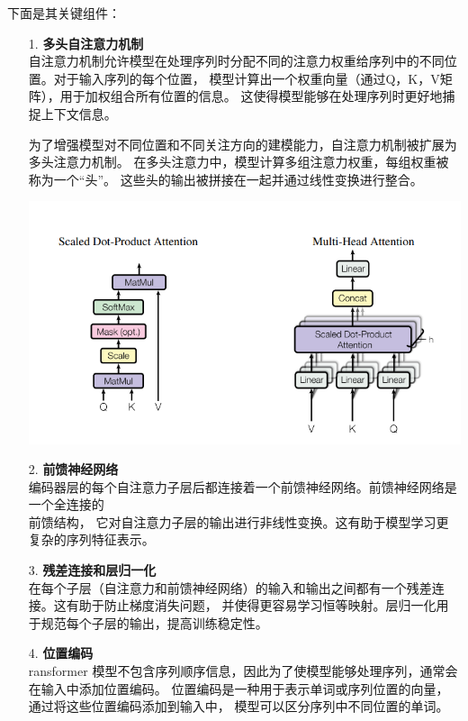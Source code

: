 \documentclass[11pt]{article}
\begin{document}
            下面是其关键组件：
            \begin{enumerate}
                \item [1. ]\textbf{多头自注意力机制}\\
                自注意力机制允许模型在处理序列时分配不同的注意力权重给序列中的不同位置。对于输入序列的每个位置，
                模型计算出一个权重向量（通过Q，K，V矩阵），用于加权组合所有位置的信息。
                这使得模型能够在处理序列时更好地捕捉上下文信息。

                为了增强模型对不同位置和不同关注方向的建模能力，自注意力机制被扩展为多头注意力机制。
                在多头注意力中，模型计算多组注意力权重，每组权重被称为一个“头”。
                这些头的输出被拼接在一起并通过线性变换进行整合。

                \begin{center}
                    \includegraphics[scale=0.9]{graph/transformer2.png}
                \end{center}

                \item [2. ]\textbf{前馈神经网络}\\
                编码器层的每个自注意力子层后都连接着一个前馈神经网络。前馈神经网络是一个全连接的\\前馈结构，
                它对自注意力子层的输出进行非线性变换。这有助于模型学习更复杂的序列特征表示。

                \item [3. ]\textbf{残差连接和层归一化}\\
                在每个子层（自注意力和前馈神经网络）的输入和输出之间都有一个残差连接。这有助于防止梯度消失问题，
                并使得更容易学习恒等映射。层归一化用于规范每个子层的输出，提高训练稳定性。

                \item [4. ]\textbf{位置编码}\\
                ransformer 模型不包含序列顺序信息，因此为了使模型能够处理序列，通常会在输入中添加位置编码。
                位置编码是一种用于表示单词或序列位置的向量，通过将这些位置编码添加到输入中，
                模型可以区分序列中不同位置的单词。


            \end{enumerate}
\end{document}
